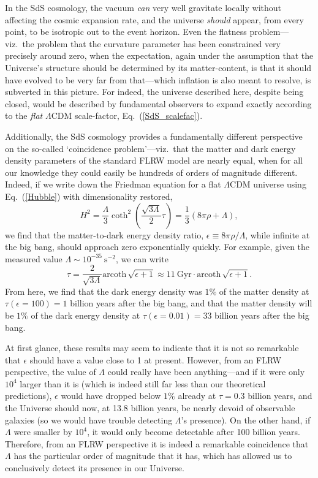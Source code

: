 \documentclass[11pt]{article}
\begin{document}
\begin{appendix}
In the SdS cosmology, the vacuum \textit{can} very well gravitate locally without affecting the cosmic expansion rate, and the universe \textit{should} appear, from every point, to be isotropic out to the event horizon. Even the flatness problem---viz.\ the problem that the curvature parameter has been constrained very precisely around zero, when the expectation, again under the assumption that the Universe's structure should be determined by its matter-content, is that it should have evolved to be very far from that---which inflation is also meant to resolve, is subverted in this picture. For indeed, the universe described here, despite being closed, would be described by fundamental observers to expand exactly  according to the \textit{flat} $\Lambda$CDM scale-factor, Eq.~(\ref{SdS_scalefac}).

Additionally, the SdS cosmology provides a fundamentally different perspective on the so-called `coincidence problem'---viz.\ that the matter and dark energy density parameters of the standard FLRW model are nearly equal, when for all our knowledge they could easily be hundreds of orders of magnitude different. Indeed, if we write down the Friedman equation for a flat $\Lambda$CDM universe using Eq.~(\ref{Hubble}) with dimensionality restored,
\begin{equation}
H^2=\frac{\Lambda}{3}\coth^2\left(\frac{\sqrt{3\Lambda}}{2}\tau\right)=\frac{1}{3}(8\pi\rho+\Lambda),
\end{equation}
we find that the matter-to-dark energy density ratio, $\epsilon\equiv8\pi\rho/\Lambda$, while infinite at the big bang, should approach zero exponentially quickly. For example, given the measured value $\Lambda\sim10^{-35}~\mathrm{s}^{-2}$, we can write
\begin{equation}
\tau=\frac{2}{\sqrt{3\Lambda}}\mathrm{arcoth}\,\sqrt{\epsilon+1}\approx11~\mathrm{Gyr}\cdot\mathrm{arcoth}\,\sqrt{\epsilon+1}.
\end{equation}
From here, we find that the dark energy density was $1\%$ of the matter density at $\tau(\epsilon=100)=1$ billion years after the big bang, and that the matter density will be $1\%$ of the dark energy density at $\tau(\epsilon=0.01)=33$ billion years after the big bang.

At first glance, these results may seem to indicate that it is not so remarkable that $\epsilon$ should have a value close to 1 at present. However, from an FLRW perspective, the value of $\Lambda$ could really have been anything---and if it were only $10^4$ larger than it is (which is indeed still far less than our theoretical predictions), $\epsilon$ would have dropped below $1\%$ already at $\tau=0.3$ billion years, and the Universe should now, at 13.8 billion years, be nearly devoid of observable galaxies (so we would have trouble detecting $\Lambda$'s presence). On the other hand, if $\Lambda$ were smaller by $10^4$, it would only become detectable after 100 billion years. Therefore, from an FLRW perspective it is indeed a remarkable coincidence that $\Lambda$ has the particular order of magnitude that it has, which has allowed us to conclusively detect its presence in our Universe.


\end{appendix}
\end{document}
